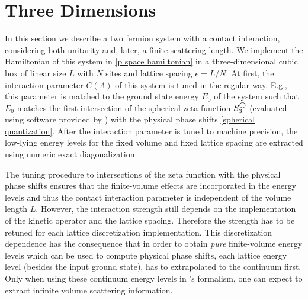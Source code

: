 \section{Three Dimensions}\label{sec:3D}

In this section we describe a two fermion system with a contact interaction, considering both unitarity and, later, a finite scattering length.
We implement the Hamiltonian of this system in \eqref{p space hamiltonian} in a three-dimensional cubic box of linear size $L$ with $N$ sites and lattice spacing $\epsilon=L/N$.
At first, the interaction parameter $C(\Lambda)$ of this system is tuned in the regular way.
E.g., this parameter is matched to the ground state energy $E_0$ of the system such that $E_0$ matches the first intersection of the spherical zeta function $S^{\bigcirc}_3$ (evaluated using software provided by ) with the physical phase shifts \eqref{spherical quantization}.
After the interaction parameter is tuned to machine precision, the low-lying energy levels for the fixed volume and fixed lattice spacing are extracted using numeric exact diagonalization.

The tuning procedure to intersections of the zeta function with the physical phase shifts ensures that the finite-volume effects are incorporated in the energy levels and thus the contact interaction parameter is independent of the volume length $L$.
However, the interaction strength still depends on the implementation of the kinetic operator and the lattice spacing.
Therefore the strength has to be retuned for each lattice discretization implementation.
This discretization dependence has the consequence that in order to obtain \textit{pure} finite-volume energy levels which can be used to compute physical phase shifts, each lattice energy level (besides the input ground state), has to extrapolated to the continuum first.
Only when using these continuum energy levels in \Luscher's formalism, one can expect to extract infinite volume scattering information.

